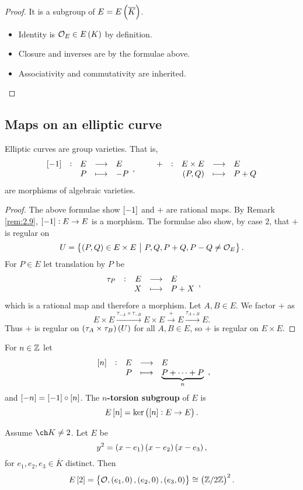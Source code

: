 \begin{proof}
It is a subgroup of $ E = E\br{\overline{K}} $.
\begin{itemize}
\item Identity is $ \OOO_E \in E\br{K} $ by definition.
\item Closure and inverses are by the formulae above.
\item Associativity and commutativity are inherited.
\end{itemize}
\end{proof}

\pagebreak

\subsection{Maps on an elliptic curve}

\begin{theorem}
\label{thm:4.4}
Elliptic curves are group varieties. That is,
$$ \function[\sbr{-1}]{E}{E}{P}{-P}, \qquad \function[+]{E \times E}{E}{\br{P, Q}}{P + Q} $$
are morphisms of algebraic varieties.
\end{theorem}

\begin{proof}
The above formulae show $ \sbr{-1} $ and $ + $ are rational maps. By Remark \ref{rem:2.9}, $ \sbr{-1} : E \to E $ is a morphism. The formulae also show, by case $ 2 $, that $ + $ is regular on
$$ U = \cbr{\br{P, Q} \in E \times E \st P, Q, P + Q, P - Q \ne \OOO_E}. $$
For $ P \in E $ let translation by $ P $ be
$$ \function[\tau_P]{E}{E}{X}{P + X}, $$
which is a rational map and therefore a morphism. Let $ A, B \in E $. We factor $ + $ as
$$ E \times E \xrightarrow{\tau_{-A} \times \tau_{-B}} E \times E \xrightarrow{+} E \xrightarrow{\tau_{A + B}} E. $$
Thus $ + $ is regular on $ \br{\tau_A \times \tau_B}\br{U} $ for all $ A, B \in E $, so $ + $ is regular on $ E \times E $.
\end{proof}

\begin{definition*}
For $ n \in \mathbb{Z} $ let
$$ \function[\sbr{n}]{E}{E}{P}{\underbrace{P + \dots + P}_n}, $$
and $ \sbr{-n} = \sbr{-1} \circ \sbr{n} $. The \textbf{$ n $-torsion subgroup} of $ E $ is
$$ E\sbr{n} = \ker \br{\sbr{n} : E \to E}. $$
\end{definition*}

\begin{lemma}
\label{lem:4.5}
Assume $ \ch K \ne 2 $. Let $ E $ be
$$ y^2 = \br{x - e_1}\br{x - e_2}\br{x - e_3}, $$
for $ e_1, e_2, e_3 \in \overline{K} $ distinct. Then
$$ E\sbr{2} = \cbr{\OOO, \br{e_1, 0}, \br{e_2, 0}, \br{e_3, 0}} \cong \br{\ZZ / 2\ZZ}^2. $$
\end{lemma}

